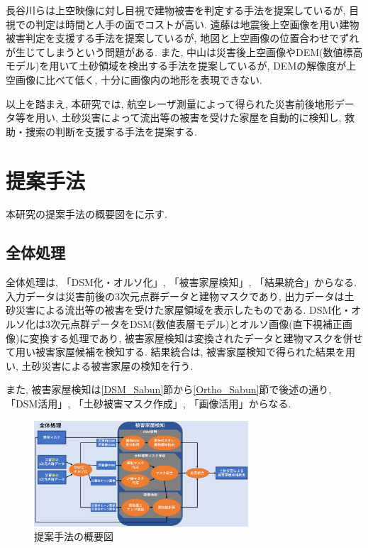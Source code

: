 \documentclass[a4paper, twocolumn, xelatex, 10pt, ja=standard, Ligatures=TeX]{bxjsarticle}
\begin{document}
		長谷川ら\cite{bunken01}は上空映像に対し目視で建物被害を判定する手法を提案しているが, 目視での判定は時間と人手の面でコストが高い. 
		遠藤\cite{bunken02}は地震後上空画像を用い建物被害判定を支援する手法を提案しているが, 地図と上空画像の位置合わせでずれが生じてしまうという問題がある. 
		また, 中山\cite{bunken03}は災害後上空画像やDEM(数値標高モデル)を用いて土砂領域を検出する手法を提案しているが, DEMの解像度が上空画像に比べて低く, 
		十分に画像内の地形を表現できない. 

		以上を踏まえ, 本研究では, 航空レーザ測量によって得られた災害前後地形データ等を用い, 
		土砂災害によって流出等の被害を受けた家屋を自動的に検知し, 救助・捜索の判断を支援する手法を提案する. 

	\section{提案手法}
		本研究の提案手法の概要図をに示す. 

		\subsection{全体処理}\label{All_process}
			全体処理は, 「DSM化・オルソ化」, 「被害家屋検知」, 「結果統合」からなる. 
			入力データは災害前後の3次元点群データと建物マスクであり, 出力データは土砂災害による流出等の被害を受けた家屋領域を表示したものである. 
			DSM化・オルソ化は3次元点群データをDSM(数値表層モデル)とオルソ画像(直下視補正画像)に変換する処理であり, 
			被害家屋検知は変換されたデータと建物マスクを併せて用い被害家屋候補を検知する. 
			結果統合は, 被害家屋検知で得られた結果を用い, 土砂災害による被害家屋の検知を行う. 
			
			また, 被害家屋検知は\ref{DSM_Sabun}節から\ref{Ortho_Sabun}節で後述の通り, 「DSM活用」, 「土砂被害マスク作成」, 「画像活用」からなる. 

			\begin{figure}[H] %
				\centering
				\includegraphics[width=8cm]{img/program_process/process_all.png}
				\caption{提案手法の概要図}
				\label{figure_process}
			\end{figure}
\end{document}
